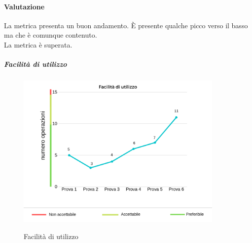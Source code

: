 	\paragraph*{Valutazione} La metrica presenta  un buon andamento. È presente qualche picco verso il basso ma che è comunque contenuto. 
	\\
	La metrica è superata. 
	\pagebreak
	\subparagraph{Facilità di utilizzo}
	\begin{center}
		\begin{figure}[h] 
			\centering 
			\includegraphics[width=0.90\textwidth]{res/images/new/facilitaUtilizzo.png}\\
			\caption{Facilità di utilizzo}
		\end{figure}
	\end{center}
